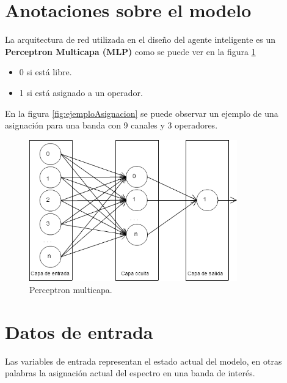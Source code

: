 
\section{Anotaciones sobre el modelo}

La arquitectura de red utilizada en el diseño del agente inteligente es un \textbf{Perceptron Multicapa (MLP)} como se puede ver en la figura \ref{fig:perceptronml}


\begin{itemize}
	\item 0 si está libre.
	\item 1 si está asignado a un operador.
\end{itemize}

En la figura \ref{fig:ejemploAsignacion} se puede observar un ejemplo de una asignación para una banda con 9 canales y 3 operadores.

\begin{figure}[H]
	\centering
	\includegraphics[width=9cm]{Capitulo4Modelo/Imagenes/redmlp.png}
	\caption{Perceptron multicapa.}
	\label{fig:perceptronml}	
\end{figure}



\section{Datos de entrada}

Las variables de entrada representan el estado actual del modelo, en otras palabras la asignación actual del espectro en una banda de interés.

